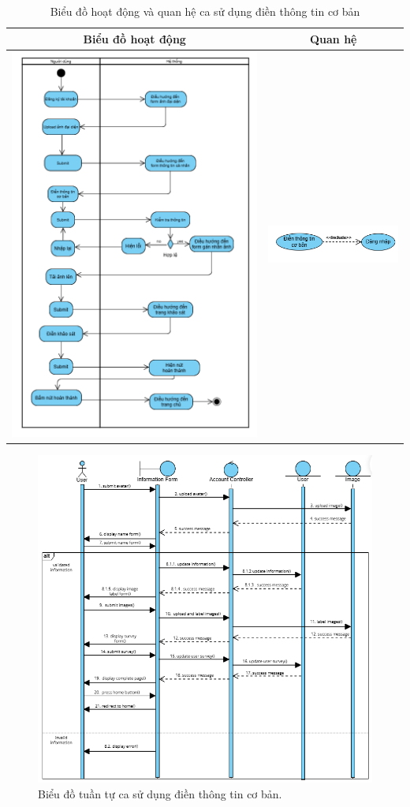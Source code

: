 \noindent
\begin{table}[H]
\centering
\caption{Biểu đồ hoạt động và quan hệ ca sử dụng điền thông tin cơ bản}
\label{tab:basic-info-usecase-activity}
\begin{tabular}{| c | c |}
    \hline
    \textbf{Biểu đồ hoạt động} & \textbf{Quan hệ} \\ 
    \hline
    \includegraphics[width=0.6\linewidth]{figures/c3/3-3-3-activity-diagram.png} 
    & 
    \includegraphics[width=0.35\linewidth]{figures/c3/3-3-3-relationship.png} \\ 
    \hline
\end{tabular}
\end{table}

\noindent
\begin{figure}[H]
    \centering  
    \includegraphics[width=1.1\textwidth]{figures/c3/3-3-3-sequence-diagram.png}
    \caption{Biểu đồ tuần tự ca sử dụng điền thông tin cơ bản.}
    \label{fig:3-3-3-sequence-diagram}
\end{figure}
